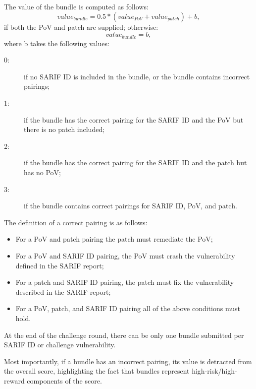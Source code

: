 The value of the bundle is computed as follows:
\begin{equation}
value_{bundle} = 0.5 * (value_{PoV} + value_{patch}) + b, 
\end{equation}
if both the PoV and patch are supplied; otherwise:
\begin{equation}
value_{bundle} = b,
\end{equation}
where b takes the following values:
\begin{description}
    \item[0:] if no SARIF ID is included in the bundle, or the bundle contains incorrect pairings;

    \item[1:] if the bundle has the correct pairing for the SARIF ID and the PoV but there is no patch included;

    \item[2:] if the bundle has the correct pairing for the SARIF ID and the patch but has no PoV;

    \item[3:] if the bundle contains correct pairings for SARIF ID, PoV, and patch.
\end{description}

The definition of a correct pairing is as follows:
\begin{itemize}
\item For a PoV and patch pairing the patch must remediate the PoV;
\item For a PoV and SARIF ID pairing, the PoV must crash the vulnerability defined in the SARIF report;
\item For a patch and SARIF ID pairing, the patch must fix the vulnerability described in the SARIF report;
\item For a PoV, patch, and SARIF ID pairing all of the above conditions must hold.
\end{itemize}
At the end of the challenge round, there can be only one bundle submitted per SARIF ID or challenge vulnerability.

Most importantly, if a bundle has an incorrect pairing, its value is detracted from the overall score, highlighting the fact that bundles represent high-risk/high-reward components of the score.

